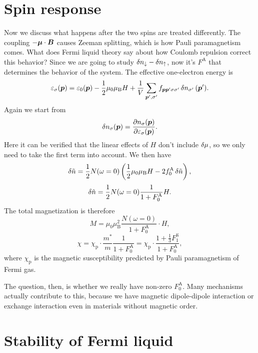 \documentclass[hyperref, a4paper]{article}
\newcommand*{\muB}{\mu_{\text{B}}}
\begin{document}
\section{Spin response}

Now we discuss what happens after the two spins are treated differently.
The coupling $- \vb*{\mu} \cdot \vb*{B}$ causes Zeeman splitting, 
which is how Pauli paramagnetism comes.
What does Fermi liquid theory say about 
how Coulomb repulsion correct this behavior?
Since we are going to study $\var{n_\downarrow} - \var{n_\uparrow}$,
now it's $F^{\text{A}}$ that determines the behavior of the system.
The effective one-electron energy is 
\begin{equation}
    \varepsilon_\sigma(\vb*{p}) = 
    \varepsilon_0(\vb*{p}) 
    - \frac{1}{2} \mu_0 \muB H 
    + \frac{1}{V} \sum_{\vb*{p}', \sigma'} f_{\vb*{p} \vb*{p}' \sigma \sigma'}
        \var{n}_{\sigma'}(\vb*{p}').
\end{equation}
Again we start from 
\[
    \var{n_\sigma(\vb*{p})} = 
    \pdv{n_\sigma(\vb*{p})}{\varepsilon_\sigma(\vb*{p})}
    (\varepsilon_\sigma(\vb*{p}) - \var{\mu}).
\]
Here it can be verified that the linear effects of $H$ 
don't include $\var{\mu}$,
so we only need to take the first term into account. 
We then have 
\[
    \var{\tilde{n}} = 
    \frac{1}{2} N(\omega = 0) 
    \left(
        \frac{1}{2} \mu_0 \muB H 
        - 2 f_0^{\text{A}} \var{\tilde{n}}
    \right),
\] 
\begin{equation}
    \var{\tilde{n}} = \frac{1}{2} N(\omega = 0) \frac{1}{1 + F^{\text{A}}_0} H.
\end{equation}
The total magnetization is therefore 
\begin{equation}
    M = \mu_0 \muB^2 \frac{N(\omega = 0)}{1 + F_0^{\text{A}}} \cdot H,
\end{equation}
\begin{equation}
    \chi = \chi_{\text{p}} \cdot \frac{m^*}{m} \frac{1}{1 + F^{\text{A}}_0}
    = \chi_{\text{p}} \cdot \frac{1 + \frac{1}{3} F^{\text{S}}_1}{1 + F^{\text{A}}_0},
\end{equation}
where $\chi_{\text{p}}$ is the magnetic susceptibility 
predicted by Pauli paramagnetism of Fermi gas.

The question, then, is whether we really have non-zero $F^{\text{A}}_0$.
Many mechanisms actually contribute to this, 
because we have magnetic dipole-dipole interaction 
or exchange interaction 
even in materials without magnetic order.

\section{Stability of Fermi liquid}
\end{document}
